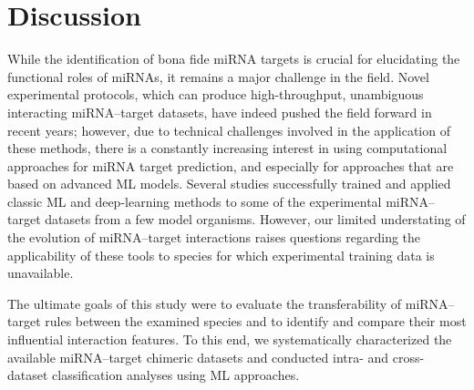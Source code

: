 \documentclass{bmcart}
\begin{document}
\clearpage
\section*{Discussion}
While the identification of bona fide miRNA targets is crucial for elucidating the functional roles of miRNAs, it remains a major challenge in the field. 
Novel experimental protocols, which can produce high-throughput, unambiguous interacting miRNA--target datasets, have indeed pushed the field forward in recent years; however, due to technical challenges involved in the application of these methods, there is a constantly increasing interest in using computational approaches for miRNA target prediction, and especially for approaches that are based on advanced ML models. Several studies successfully trained and applied classic ML \cite{lu2016learning, ding2016tarpmir, wang2016improving, liu2019prediction} and deep-learning \cite{wen2018deepmirtar, paker2019mirlstm, pla2018miraw} methods to some of the experimental miRNA--target datasets from a few model organisms. However, our limited understating of the evolution of miRNA--target interactions raises questions regarding the applicability of these tools to species for which  experimental training data is unavailable.

The ultimate goals of this study were to evaluate the transferability of miRNA--target rules between the examined species and to identify and compare their most influential interaction features. To this end, we systematically characterized the available miRNA--target chimeric datasets and conducted intra- and cross- dataset classification analyses using ML approaches.  
\end{document}
